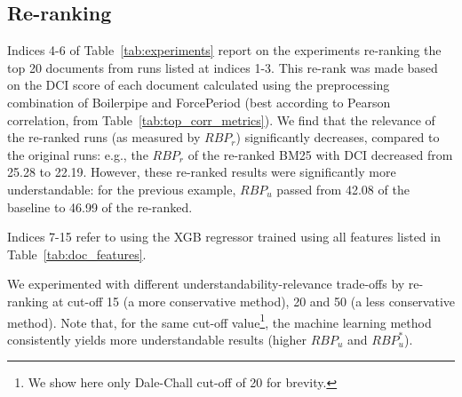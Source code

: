
\subsection{Re-ranking}
\label{results:reranking}

Indices 4-6 of Table~\ref{tab:experiments} report on the experiments re-ranking the top 20 documents from runs listed at indices 1-3. This re-rank was made based on the DCI score of each document calculated using the preprocessing combination of Boilerpipe and ForcePeriod (best according to Pearson correlation, from Table~\ref{tab:top_corr_metrics}).
We find that the relevance of the re-ranked runs (as measured by $RBP_r$) significantly decreases, compared to the original runs: e.g., the $RBP_r$ of the re-ranked BM25 with DCI decreased from 25.28 to 22.19. However, these re-ranked results were significantly more understandable: for the previous example, $RBP_u$ passed from 42.08 of the baseline to 46.99 of the re-ranked. 



Indices  7-15 refer to using the XGB regressor trained using all features listed in Table~\ref{tab:doc_features}. 

We experimented with different understandability-relevance trade-offs by re-ranking at cut-off 15 (a more conservative method), 20 and 50 (a less conservative method). 
Note that, for the same cut-off value\footnote{We show here only Dale-Chall cut-off of 20 for brevity.}, the machine learning method consistently yields more understandable results (higher $RBP_u$ and $RBP_u^*$). 

